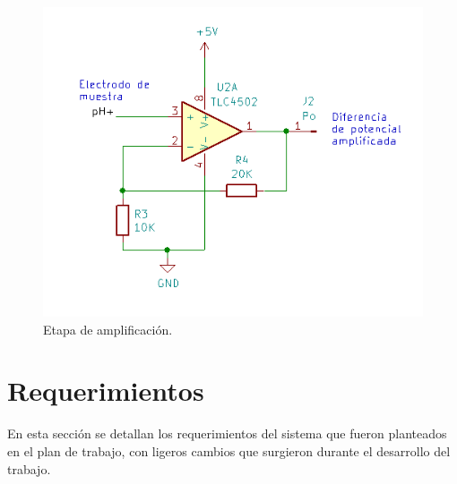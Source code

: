 \begin{figure}[htbp]
	\centering
	\includegraphics[width=.7\textwidth]{./Figures/etapaAmpli.png}
	\caption{Etapa de amplificación.}
	\label{fig:etapaAmpli}
\end{figure}

\vspace{1,5 cm}

\section{Requerimientos}
\label{sec:requerimientos}

En esta sección se detallan los requerimientos del sistema que fueron planteados en el plan de trabajo, con ligeros cambios que surgieron durante el desarrollo del trabajo.

